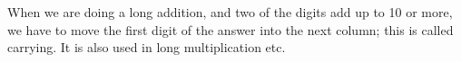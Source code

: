 When we are doing a long addition, and two of the digits
add up to 10 or more, we have to move the first digit of the
answer into the next column; this is called carrying. It is
also used in long multiplication etc.